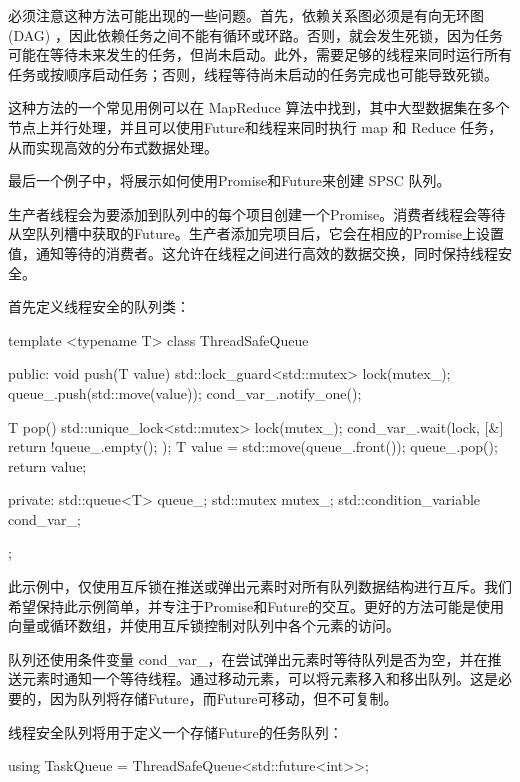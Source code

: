 必须注意这种方法可能出现的一些问题。首先，依赖关系图必须是有向无环图 (DAG) ，因此依赖任务之间不能有循环或环路。否则，就会发生死锁，因为任务可能在等待未来发生的任务，但尚未启动。此外，需要足够的线程来同时运行所有任务或按顺序启动任务；否则，线程等待尚未启动的任务完成也可能导致死锁。

这种方法的一个常见用例可以在 MapReduce 算法中找到，其中大型数据集在多个节点上并行处理，并且可以使用Future和线程来同时执行 map 和 Reduce 任务，从而实现高效的分布式数据处理。


最后一个例子中，将展示如何使用Promise和Future来创建 SPSC 队列。

生产者线程会为要添加到队列中的每个项目创建一个Promise。消费者线程会等待从空队列槽中获取的Future。生产者添加完项目后，它会在相应的Promise上设置值，通知等待的消费者。这允许在线程之间进行高效的数据交换，同时保持线程安全。

首先定义线程安全的队列类：

\begin{cpp}
template <typename T>
class ThreadSafeQueue {
public:
    void push(T value) {
        std::lock_guard<std::mutex> lock(mutex_);
        queue_.push(std::move(value));
        cond_var_.notify_one();
    }

    T pop() {
        std::unique_lock<std::mutex> lock(mutex_);
        cond_var_.wait(lock, [&]{
            return !queue_.empty();
        });
        T value = std::move(queue_.front());
        queue_.pop();
        return value;
    }

private:
    std::queue<T> queue_;
    std::mutex mutex_;
    std::condition_variable cond_var_;
};
\end{cpp}

此示例中，仅使用互斥锁在推送或弹出元素时对所有队列数据结构进行互斥。我们希望保持此示例简单，并专注于Promise和Future的交互。更好的方法可能是使用向量或循环数组，并使用互斥锁控制对队列中各个元素的访问。

队列还使用条件变量 cond\_var\_，在尝试弹出元素时等待队列是否为空，并在推送元素时通知一个等待线程。通过移动元素，可以将元素移入和移出队列。这是必要的，因为队列将存储Future，而Future可移动，但不可复制。

线程安全队列将用于定义一个存储Future的任务队列：

\begin{cpp}
using TaskQueue = ThreadSafeQueue<std::future<int>>;
\end{cpp}

